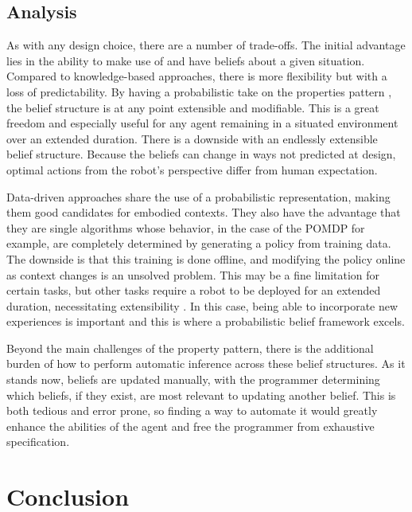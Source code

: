 \documentclass[12pt]{article}
\begin{document}
\subsection{Analysis}
\label{sec:analysis}
As with any design choice, there are a number of trade-offs. The
initial advantage lies in the ability to make use of and have beliefs
about a given situation.  Compared to knowledge-based approaches,
there is more flexibility but with a loss of predictability. By having
a probabilistic take on the properties pattern
\cite{Fowler1997:properties}, the belief structure is at any point
extensible and modifiable. This is a great freedom and especially
useful for any agent remaining in a situated environment over an
extended duration.  There is a downside with an endlessly extensible
belief structure. Because the beliefs can change in ways not predicted
at design, optimal actions from the robot's perspective differ from
human expectation.

Data-driven approaches share the use of a probabilistic
representation, making them good candidates for embodied
contexts. They also have the advantage that they are single algorithms
whose behavior, in the case of the POMDP for example, are completely
determined by generating a policy from training data. The downside is
that this training is done offline, and modifying the policy online as
context changes is an unsolved problem. This may be a fine limitation
for certain tasks, but other tasks require a robot to be deployed for
an extended duration, necessitating extensibility . In this case,
being able to incorporate new experiences is important and this is
where a probabilistic belief framework excels.

Beyond the main challenges of the property pattern, there is the
additional burden of how to perform automatic inference across these
belief structures. As it stands now, beliefs are updated manually,
with the programmer determining which beliefs, if they exist, are most
relevant to updating another belief. This is both tedious and error
prone, so finding a way to automate it would greatly enhance the
abilities of the agent and free the programmer from exhaustive
specification.

\section{Conclusion}
\label{sec:conclusion}
\end{document}

